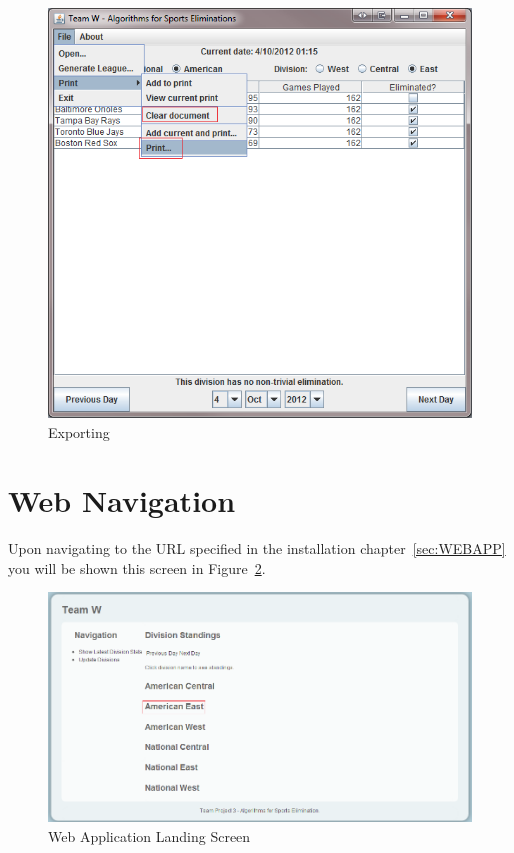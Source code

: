 \begin{figure}
  \includegraphics[width=\linewidth,keepaspectratio]{images/userManualDesk13.png}
  \caption{Exporting}\label{fig:EXPEXP}
\end{figure}
\newpage

\section{Web Navigation}

Upon navigating to the URL specified in the installation
chapter~\ref{sec:WEBAPP} you will be shown this screen in Figure~\ref{fig:WEBHOME}.

\begin{figure}
\includegraphics[width=\linewidth,keepaspectratio]{images/userManualWeb1.png}
\caption{Web Application Landing Screen}\label{fig:WEBHOME}
\end{figure}

